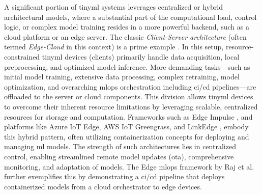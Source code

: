 A significant portion of \gls{tinyml} systems leverages centralized or hybrid architectural models, where a substantial part of the computational load, control logic, or complex model training resides in a more powerful backend, such as a cloud platform or an edge server. The classic \textit{Client-Server architecture} (often termed \textit{Edge-Cloud} in this context) is a prime example \cite{doyuTinyMLaaSEcosystemMachine2021, zaidiUnlockingEdgeIntelligence2022, peltonenLinkEdgeOpensourcedMLOps2023}. In this setup, resource-constrained \gls{tinyml} devices (clients) primarily handle data acquisition, local preprocessing, and optimized model inference. More demanding tasks—such as initial model training, extensive data processing, complex retraining, model optimization, and overarching \gls{mlops} orchestration including \gls{ci}/\gls{cd} pipelines—are offloaded to the server or cloud components. This division allows \gls{tinyml} devices to overcome their inherent resource limitations by leveraging scalable, centralized resources for storage and computation. Frameworks such as Edge Impulse \cite{banburyEdgeImpulseMLOps2023}, and platforms like Azure IoT Edge, AWS IoT Greengrass, and LinkEdge \cite{peltonenLinkEdgeOpensourcedMLOps2023}, embody this hybrid pattern, often utilizing containerization concepts for deploying and managing \gls{ml} models. The strength of such architectures lies in centralized control, enabling streamlined remote model updates (\gls{ota}), comprehensive monitoring, and adaptation of models. The Edge \gls{mlops} framework by Raj et al.~\cite{rajEdgeMLOpsAutomation2021} further exemplifies this by demonstrating a \gls{ci}/\gls{cd} pipeline that deploys containerized models from a cloud orchestrator to edge devices.

